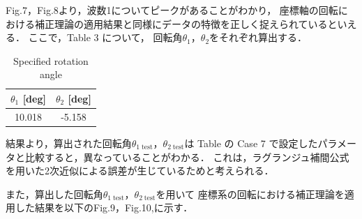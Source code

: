 \documentclass[twocolumn,a4j]{jsarticle}
\begin{document}
Fig.7，Fig.8より，波数1についてピークがあることがわかり，
座標軸の回転における補正理論の適用結果と同様にデータの特徴を正しく捉えられているといえる．
ここで，Table 3 について，
回転角$\theta_1$，$\theta_2$をそれぞれ算出する．

\begin{table}[htbp]
    \begin{center}
        \caption{Specified rotation angle }
        \begin{tabular}{|p{20mm}|p{20mm}|}
            \hline
            \multicolumn{1}{|c|}{$\theta_1$ [deg]} & \multicolumn{1}{|c|}{$\theta_2$ [deg]} \\ \hline
            \multicolumn{1}{|c|}{10.018}           & \multicolumn{1}{|c|}{-5.158}           \\ \hline
        \end{tabular}
    \end{center}
\end{table}


結果より，算出された回転角$\theta_{1\;\mathrm{test}}$，$\theta_{2\;\mathrm{test}}$は
Table の Case 7 で設定したパラメータと比較すると，異なっていることがわかる．
これは，ラグランジュ補間公式を用いた2次近似による誤差が生じているためと考えられる．

また，算出した回転角$\theta_{1\;\mathrm{test}}$，$\theta_{2\;\mathrm{test}}$を用いて
座標系の回転における補正理論を適用した結果を以下のFig.9，Fig.10,に示す．
\end{document}
